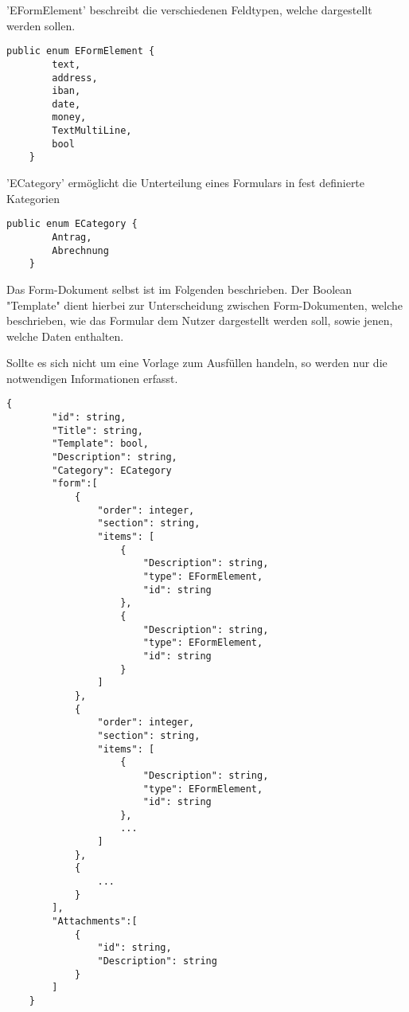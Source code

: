 'EFormElement' beschreibt die verschiedenen Feldtypen, welche dargestellt werden sollen.
\begin{lstlisting}[label={lst:EFormElement}]
    public enum EFormElement {
        text,
        address,
        iban,
        date,
        money,
        TextMultiLine,
        bool
    }
\end{lstlisting}


'ECategory' ermöglicht die Unterteilung eines Formulars in fest definierte Kategorien
\begin{lstlisting}[label={lst:ECategory}]
    public enum ECategory {
        Antrag,
        Abrechnung
    }
\end{lstlisting}

Das Form-Dokument selbst ist im Folgenden beschrieben.
Der Boolean "Template" dient hierbei zur Unterscheidung zwischen
Form-Dokumenten, welche beschrieben, wie das Formular dem Nutzer
dargestellt werden soll, sowie jenen, welche Daten enthalten.

Sollte es sich nicht um eine Vorlage zum Ausfüllen handeln, so werden nur die notwendigen Informationen erfasst.
\begin{lstlisting}[label={lst:lstlistingdoc}]
    {
        "id": string,
        "Title": string,
        "Template": bool,
        "Description": string,
        "Category": ECategory
        "form":[
            {
                "order": integer,
                "section": string,
                "items": [
                    {
                        "Description": string,
                        "type": EFormElement,
                        "id": string
                    },
                    {
                        "Description": string,
                        "type": EFormElement,
                        "id": string
                    }
                ]
            },
            {
                "order": integer,
                "section": string,
                "items": [
                    {
                        "Description": string,
                        "type": EFormElement,
                        "id": string
                    },
                    ...
                ]
            },
            {
                ...
            }
        ],
        "Attachments":[
            {
                "id": string,
                "Description": string
            }
        ]
    }
\end{lstlisting}